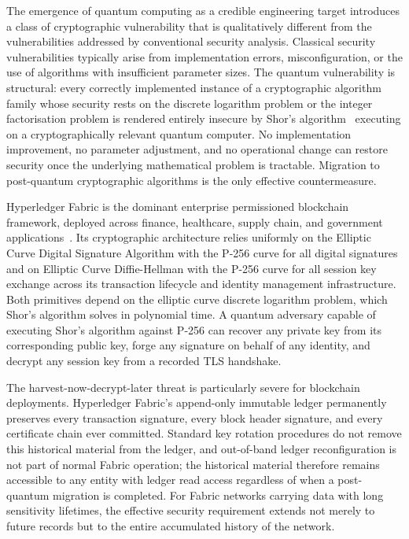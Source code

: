 \documentclass[conference]{IEEEtran}
\begin{document}
The emergence of quantum computing as a credible engineering target
introduces a class of cryptographic vulnerability that is qualitatively
different from the vulnerabilities addressed by conventional security
analysis. Classical security vulnerabilities typically arise from
implementation errors, misconfiguration, or the use of algorithms with
insufficient parameter sizes. The quantum vulnerability is structural:
every correctly implemented instance of a cryptographic algorithm family
whose security rests on the discrete logarithm problem or the integer
factorisation problem is rendered entirely insecure by Shor's
algorithm~\cite{shor1994} executing on a cryptographically relevant
quantum computer. No implementation improvement, no parameter adjustment,
and no operational change can restore security once the underlying
mathematical problem is tractable. Migration to post-quantum cryptographic
algorithms is the only effective countermeasure.

Hyperledger Fabric is the dominant enterprise permissioned blockchain
framework, deployed across finance, healthcare, supply chain, and
government applications~\cite{androulaki2018}. Its cryptographic
architecture relies uniformly on the Elliptic Curve Digital Signature
Algorithm with the P-256 curve for all digital signatures and on Elliptic
Curve Diffie-Hellman with the P-256 curve for all session key exchange
across its transaction lifecycle and identity management infrastructure.
Both primitives depend on the elliptic curve discrete logarithm problem,
which Shor's algorithm solves in polynomial time. A quantum adversary
capable of executing Shor's algorithm against P-256 can recover any
private key from its corresponding public key, forge any signature on
behalf of any identity, and decrypt any session key from a recorded TLS
handshake.

The harvest-now-decrypt-later threat is particularly severe for blockchain
deployments. Hyperledger Fabric's append-only immutable ledger permanently
preserves every transaction signature, every block header signature, and
every certificate chain ever committed. Standard key rotation procedures
do not remove this historical material from the ledger, and out-of-band
ledger reconfiguration is not part of normal Fabric operation; the
historical material therefore remains accessible to any entity with
ledger read access regardless of when a post-quantum migration is
completed. For Fabric networks
carrying data with long sensitivity lifetimes, the effective security
requirement extends not merely to future records but to the entire
accumulated history of the network.
\end{document}
